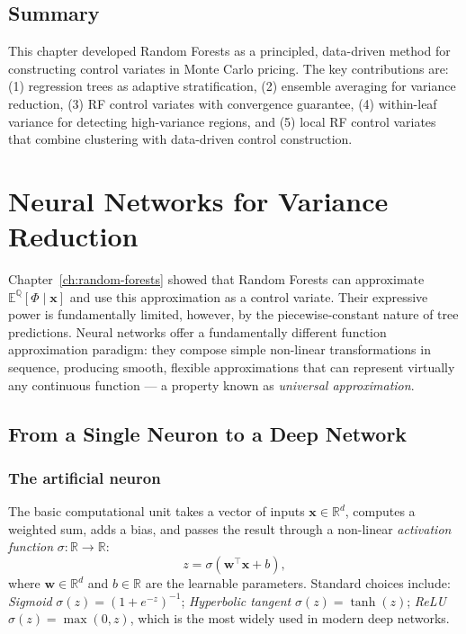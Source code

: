 \documentclass[12pt, a4paper]{report}
\theoremstyle{definition}
\newcommand{\Q}{\mathbb{Q}}
\newcommand{\R}{\mathbb{R}}
\begin{document}
\section{Summary}
\label{sec:rf-summary}

This chapter developed Random Forests as a principled, data-driven method
for constructing control variates in Monte Carlo pricing.  The key
contributions are: (1) regression trees as adaptive stratification,
(2) ensemble averaging for variance reduction, (3) RF control variates
with convergence guarantee, (4) within-leaf variance for detecting
high-variance regions, and (5) local RF control variates that combine
clustering with data-driven control construction.

\chapter{Neural Networks for Variance Reduction}
\label{ch:neural-networks}

Chapter~\ref{ch:random-forests} showed that Random Forests can
approximate $\mathbb{E}^{\Q}[\Phi \mid \mathbf{x}]$ and use this
approximation as a control variate.  Their expressive power is
fundamentally limited, however, by the piecewise-constant nature of tree
predictions.  Neural networks offer a fundamentally different function
approximation paradigm: they compose simple non-linear transformations
in sequence, producing smooth, flexible approximations that can represent
virtually any continuous function --- a property known as \emph{universal
approximation}.

\section{From a Single Neuron to a Deep Network}
\label{sec:neuron}

\subsection{The artificial neuron}

The basic computational unit takes a vector of inputs
$\mathbf{x} \in \R^d$, computes a weighted sum, adds a bias, and passes
the result through a non-linear \emph{activation function}
$\sigma : \R \to \R$:
\begin{equation}
    z = \sigma\!\left(\mathbf{w}^\top \mathbf{x} + b\right),
    \label{eq:neuron}
\end{equation}
where $\mathbf{w} \in \R^d$ and $b \in \R$ are the learnable parameters.
Standard choices include: \emph{Sigmoid}
$\sigma(z) = (1 + e^{-z})^{-1}$;
\emph{Hyperbolic tangent} $\sigma(z) = \tanh(z)$;
\emph{ReLU} $\sigma(z) = \max(0,z)$, which is the most widely used in
modern deep networks.
\end{document}
